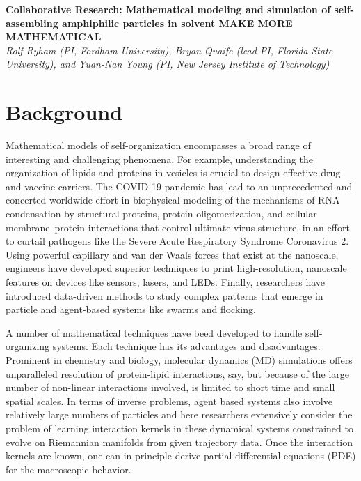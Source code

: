 \noindent
{\bf Collaborative Research: Mathematical modeling and simulation of
self-assembling amphiphilic particles in solvent {\bf MAKE MORE MATHEMATICAL}} \\
{\em Rolf Ryham (PI, Fordham University),
Bryan Quaife (lead PI, Florida State University), and
Yuan-Nan Young (PI, New Jersey Institute of Technology)}

\section{Background}
\label{sec:background}

Mathematical models of self-organization encompasses a
broad range of interesting and challenging phenomena.
For example, understanding the organization of lipids and proteins in vesicles
is crucial to design effective drug and vaccine carriers.
The COVID-19 pandemic has lead to an unprecedented and concerted worldwide
effort in biophysical modeling of the mechanisms of RNA condensation
by structural proteins, protein oligomerization, and cellular
membrane–protein interactions that control ultimate virus structure,
in an effort to curtail pathogens like the Severe Acute Respiratory Syndrome Coronavirus 2.
Using powerful capillary and van der Waals forces that exist at the nanoscale, engineers
have developed superior techniques to print 
high-resolution, nanoscale features on devices like sensors, lasers, and LEDs.
Finally, researchers have introduced data-driven methods 
to study complex patterns that emerge in particle and agent-based systems like swarms
and flocking.

A number of mathematical techniques have beed developed to handle
self-organizing systems.  Each technique has its advantages and disadvantages.
Prominent in chemistry and biology, molecular
dynamics (MD) simulations offers unparalleled resolution of protein-lipid interactions,
say, but because of the large number of non-linear interactions involved,
is limited to short time and small spatial scales.
In terms of inverse problems,
agent based systems also involve relatively large numbers of particles
and here researchers extensively consider the problem  
of learning interaction kernels in these dynamical systems
constrained to evolve on Riemannian manifolds from given trajectory data.
Once the interaction kernels are known, one can in principle derive
partial differential equations (PDE) for the macroscopic behavior. 

